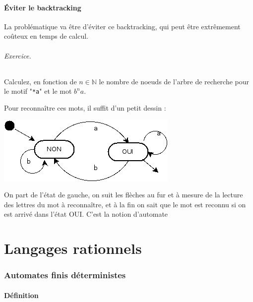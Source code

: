 \documentclass[10pt,twoside]{article}
\begin{document}



\subsection{Éviter le backtracking}

La problématique va être d'éviter ce backtracking, qui peut être
extrêmement coûteux en temps de calcul.

\paragraph{Exercice.} Calculez, en fonction de $n \in \mathbb{N}$ le nombre de noeuds de l'arbre de recherche
pour le motif "\texttt{*a}" et le mot $b^na$.

Pour reconnaître ces mots, il suffit d'un petit dessin  :

\begin{center}
\includegraphics[width=.8\linewidth]{../dia/auto}
\end{center}



On part de l'état de gauche, on suit les flèches au fur et à mesure de la lecture des lettres du mot à reconnaître, et à la fin on sait que le mot est reconnu si on est arrivé dans l'état OUI. C'est la notion d'automate

\clearpage

\part{Langages rationnels}

\section{Automates finis déterministes}

\subsection{Définition}
\end{document}
